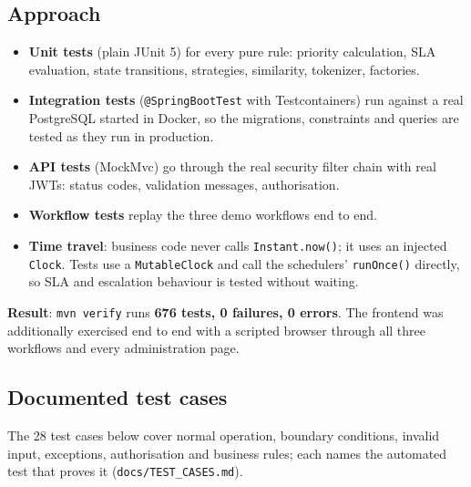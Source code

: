 \documentclass[11pt,a4paper]{article}
\begin{document}
\subsection{Approach}
\begin{itemize}
\item \textbf{Unit tests} (plain JUnit 5) for every pure rule: priority calculation, SLA evaluation, state transitions, strategies, similarity, tokenizer, factories.
\item \textbf{Integration tests} (\texttt{@SpringBootTest} with Testcontainers) run against a real PostgreSQL started in Docker, so the migrations, constraints and queries are tested as they run in production.
\item \textbf{API tests} (MockMvc) go through the real security filter chain with real JWTs: status codes, validation messages, authorisation.
\item \textbf{Workflow tests} replay the three demo workflows end to end.
\item \textbf{Time travel}: business code never calls \texttt{Instant.now()}; it uses an injected \texttt{Clock}. Tests use a \texttt{MutableClock} and call the schedulers' \texttt{runOnce()} directly, so SLA and escalation behaviour is tested without waiting.
\end{itemize}

\textbf{Result}: \texttt{mvn verify} runs \textbf{676 tests, 0 failures, 0 errors}. The frontend was additionally exercised end to end with a scripted browser through all three workflows and every administration page.

\subsection{Documented test cases}
The 28 test cases below cover normal operation, boundary conditions, invalid input, exceptions, authorisation and business rules; each names the automated test that proves it (\texttt{docs/TEST\_CASES.md}).
{\small}

\end{document}
